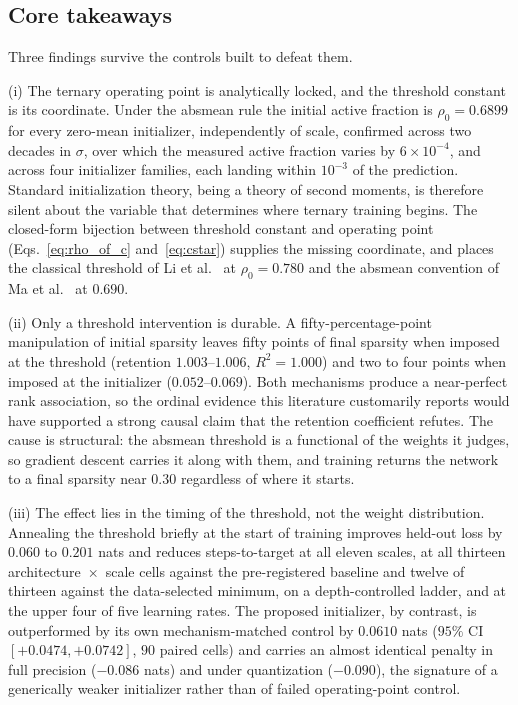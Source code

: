 \documentclass[final,5p,times,twocolumn]{elsarticle}
\theoremstyle{remark}
\newcommand{\rhoz}{\rho_{0}}
\begin{document}
\subsection{Core takeaways}
\label{sec:conc-takeaways}

Three findings survive the controls built to defeat them.

(i) The ternary operating point is analytically locked, and the
threshold constant is its coordinate. Under the absmean rule the initial
active fraction is $\rhoz = 0.6899$ for every zero-mean initializer,
independently of scale, confirmed across two decades in $\sigma$, over which
the measured active fraction varies by $6\times10^{-4}$, and across four
initializer families, each landing within $10^{-3}$ of the prediction. Standard initialization theory,
being a theory of second moments, is therefore silent about the variable that
determines where ternary training begins. The closed-form bijection between
threshold constant and operating point (Eqs.~\eqref{eq:rho_of_c}
and~\eqref{eq:cstar}) supplies the missing coordinate, and places the classical
threshold of Li et al.~\cite{li2016} at $\rhoz = 0.780$ and the absmean
convention of Ma et al.~\cite{ma2024} at $0.690$.

(ii) Only a threshold intervention is durable. A
fifty-percentage-point manipulation of initial sparsity leaves fifty points of
final sparsity when imposed at the threshold (retention $1.003$--$1.006$,
$R^{2} = 1.000$) and two to four points when imposed at the initializer
($0.052$--$0.069$). Both mechanisms produce a near-perfect rank association, so
the ordinal evidence this literature customarily reports would have supported a
strong causal claim that the retention coefficient refutes. The cause is
structural: the absmean threshold is a functional of the weights it judges, so
gradient descent carries it along with them, and training returns the network
to a final sparsity near $0.30$ regardless of where it starts.

(iii) The effect lies in the timing of the threshold, not the weight
distribution. Annealing the threshold briefly at the start of training
improves held-out loss by $0.060$ to $0.201$ nats and reduces steps-to-target
at all eleven scales, at all thirteen architecture~$\times$~scale cells against
the pre-registered baseline and twelve of thirteen against the data-selected
minimum, on a depth-controlled ladder, and at the upper four of five learning
rates. The
proposed initializer, by contrast, is outperformed by its own mechanism-matched
control by $0.0610$ nats ($95\%$ CI $[+0.0474,+0.0742]$, $90$ paired cells) and
carries an almost identical penalty in full precision ($-0.086$ nats) and
under quantization ($-0.090$), the signature of a generically weaker initializer
rather than of failed operating-point control.
\end{document}
